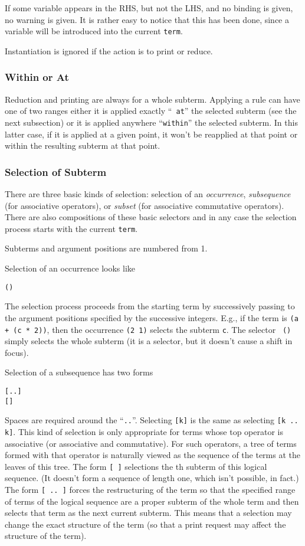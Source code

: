 If some variable appears in the RHS, but not the LHS, and no binding
is given, no warning is given.  It is rather easy to notice that this
has been done, since a variable will be introduced into the current
{\tt term}.

Instantiation is ignored if the action is to print or reduce.

\subsubsection{Within or At}
Reduction and printing are always for a whole subterm.  Applying a
rule can have one of two ranges either it is applied exactly ``{\tt
  at}'' the selected subterm (see the next subsection) or it is
applied anywhere ``{\tt within}'' the selected subterm.  In this
latter case, if it is applied at a given point, it won't be reapplied
at that point or within the resulting subterm at that point.

\subsubsection{Selection of Subterm}
There are three basic kinds of selection: selection of an {\em
  occurrence}, {\em subsequence} (for associative operators), or {\em
  subset} (for associative commutative operators).  There are also
compositions of these basic selectors and in any case the selection
process starts with the current {\tt term}.

Subterms and argument positions are numbered from 1.

Selection of an occurrence looks like
\begin{alltt}
        (\itr)
\end{alltt}
The selection process proceeds from the starting term by successively
passing to the argument positions specified by the successive
integers.  E.g., if the term is {\tt (a + (c * 2))}, then the
occurrence {\tt (2 1)} selects the subterm {\tt c}.  The selector {\tt
  ()} simply selects the whole subterm (it is a selector, but it
doesn't cause a shift in focus).

Selection of a subsequence has two forms
\begin{alltt}
        [  ..  ]
        [  ]
\end{alltt}
Spaces are required around the ``{\tt ..}''.  Selecting {\tt [k]} is
the same as selecting {\tt [k .. k]}.  This kind of selection is only
appropriate for terms whose top operator is associative (or
associative and commutative).  For such operators, a tree of terms
formed with that operator is naturally viewed as the sequence of the
terms at the leaves of this tree.  The form {\tt [  ]}
selections the th subterm of this logical sequence.  (It
doesn't form a sequence of length one, which isn't possible, in fact.)
The form {\tt [  ..  ]} forces the restructuring of
the term so that the specified range of terms of the logical sequence
are a proper subterm of the whole term and then selects that term as
the next current subterm.  This means that a selection may change the
exact structure of the term (so that a print request may affect the
structure of the term).

